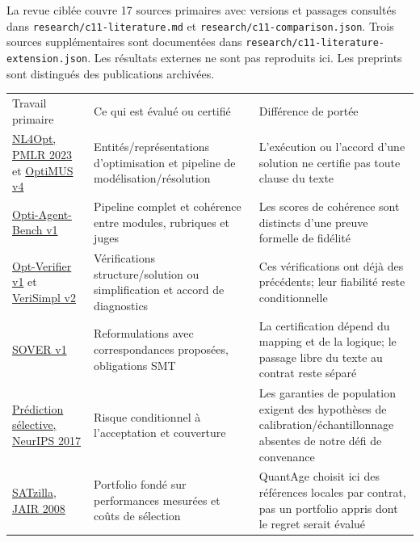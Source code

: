 \documentclass[11pt]{article}
\begin{document}
La revue ciblée couvre 17 sources primaires avec versions et passages consultés dans \texttt{research/c11-literature.md} et \texttt{research/c11-comparison.json}. Trois sources supplémentaires sont documentées dans \texttt{research/c11-literature-extension.json}. Les résultats externes ne sont pas reproduits ici. Les preprints sont distingués des publications archivées.

\begin{center}\small
\begin{tabularx}{\textwidth}{@{}XXX@{}}
\hline
Travail primaire & Ce qui est évalué ou certifié & Différence de portée\\
\href{\detokenize{https://proceedings.mlr.press/v220/ramamonjison23a/ramamonjison23a.pdf}}{NL4Opt, PMLR 2023} et \href{\detokenize{https://arxiv.org/html/2407.19633v4}}{OptiMUS v4} & Entités/représentations d'optimisation et pipeline de modélisation/résolution & L'exécution ou l'accord d'une solution ne certifie pas toute clause du texte\\
\href{\detokenize{https://arxiv.org/html/2607.10768v1}}{Opti-Agent-Bench v1} & Pipeline complet et cohérence entre modules, rubriques et juges & Les scores de cohérence sont distincts d'une preuve formelle de fidélité\\
\href{\detokenize{https://arxiv.org/html/2605.29556v1}}{Opt-Verifier v1} et \href{\detokenize{https://arxiv.org/html/2607.20474v2}}{VeriSimpl v2} & Vérifications structure/solution ou simplification et accord de diagnostics & Ces vérifications ont déjà des précédents; leur fiabilité reste conditionnelle\\
\href{\detokenize{https://arxiv.org/html/2609.00728v1}}{SOVER v1} & Reformulations avec correspondances proposées, obligations SMT & La certification dépend du mapping et de la logique; le passage libre du texte au contrat reste séparé\\
\href{\detokenize{https://papers.neurips.cc/paper/2017/file/4a8423d5e91fda00bb7e46540e2b0cf1-Paper.pdf}}{Prédiction sélective, NeurIPS 2017} & Risque conditionnel à l'acceptation et couverture & Les garanties de population exigent des hypothèses de calibration/échantillonnage absentes de notre défi de convenance\\
\href{\detokenize{https://ml.informatik.uni-freiburg.de/wp-content/uploads/papers/08-JAIR-Satzilla.pdf}}{SATzilla, JAIR 2008} & Portfolio fondé sur performances mesurées et coûts de sélection & QuantAge choisit ici des références locales par contrat, pas un portfolio appris dont le regret serait évalué\\

\end{tabularx}
\end{center}
\end{document}
